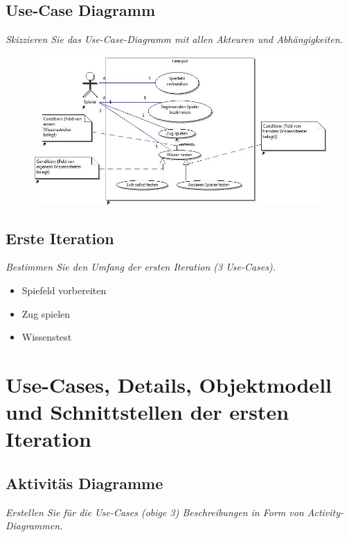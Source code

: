 \documentclass{report}
\begin{document}
\subsection{Use-Case Diagramm}
\textit{Skizzieren Sie das Use-Case-Diagramm mit allen Akteuren und Abh\"angigkeiten.}
\begin{figure}[H]
	\includegraphics[width=\textwidth]{Diagramme/UseCaseDiagram.jpg}
	\centering
\end{figure}

\subsection{Erste Iteration}
\textit{Bestimmen Sie den Umfang der ersten Iteration (3 Use-Cases).}
\begin{itemize}
   \item Spiefeld vorbereiten
   \item Zug spielen
   \item Wissenstest
\end{itemize}

\section{Use-Cases, Details, Objektmodell und Schnittstellen der ersten Iteration}

\subsection{Aktivitäs Diagramme}
\textit{Erstellen Sie f\"ur die Use-Cases (obige 3) Beschreibungen in Form von Activity-Diagrammen.}
\end{document}
